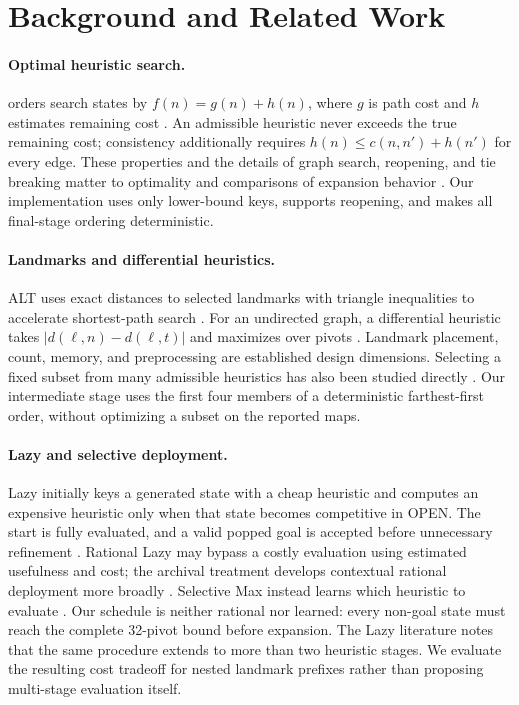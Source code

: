 \section{Background and Related Work}
\label{sec:related}

\paragraph{Optimal heuristic search.}
\Astar{} orders search states by $f(n)=g(n)+h(n)$, where $g$ is path cost and
$h$ estimates remaining cost \citep{hart1968formal}.  An admissible heuristic
never exceeds the true remaining cost; consistency additionally requires
$h(n)\leq c(n,n')+h(n')$ for every edge.  These properties and the details of
graph search, reopening, and tie breaking matter to optimality and comparisons
of expansion behavior \citep{dechter1985generalized}.  Our implementation
uses only lower-bound keys, supports reopening, and makes all final-stage
ordering deterministic.

\paragraph{Landmarks and differential heuristics.}
ALT uses exact distances to selected landmarks with triangle inequalities to
accelerate shortest-path search \citep{goldberg2005computing}.  For an
undirected graph, a differential heuristic takes
$|d(\ell,n)-d(\ell,t)|$ and maximizes over pivots
\citep{sturtevant2009memory}.  Landmark placement, count, memory, and
preprocessing are established design dimensions.  Selecting a fixed subset
from many admissible heuristics has also been studied directly
\citep{rayner2013subset}.  Our intermediate stage uses the first four members
of a deterministic farthest-first order, without optimizing a subset on the
reported maps.

\paragraph{Lazy and selective deployment.}
Lazy \Astar{} initially keys a generated state with a cheap heuristic and
computes an expensive heuristic only when that state becomes competitive in
OPEN.  The start is fully evaluated, and a valid popped goal is accepted
before unnecessary refinement \citep{tolpin2013towards}.  Rational Lazy
\Astar{} may bypass a costly evaluation using estimated usefulness and cost;
the archival treatment develops contextual rational deployment more broadly
\citep{karpas2018rational}.  Selective Max instead learns which heuristic to
evaluate \citep{domshlak2010max,domshlak2012online}.  Our schedule is neither
rational nor learned: every non-goal state must reach the complete 32-pivot
bound before expansion.  The Lazy \Astar{} literature notes that the same
procedure extends to more than two heuristic stages.  We evaluate the
resulting cost tradeoff for nested landmark prefixes rather than proposing
multi-stage evaluation itself.

